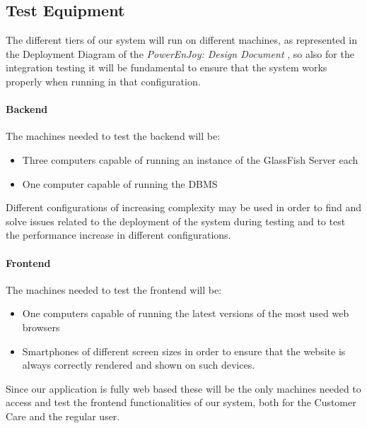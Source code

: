\subsection{Test Equipment}
The different tiers of our system will run on different machines, as represented in the Deployment Diagram of the \emph{PowerEnJoy: Design Document} \cite{DD}, so also for the integration testing it will be fundamental to ensure that the system works properly when running in that configuration.
\paragraph{Backend}
The machines needed to test the backend will be:
\begin{itemize}
	\item Three computers capable of running an instance of the GlassFish Server each
	\item One computer capable of running the DBMS
\end{itemize}
Different configurations of increasing complexity may be used in order to find and solve issues related to the deployment of the system during testing and to test the performance increase in different configurations.
\paragraph{Frontend}
The machines needed to test the frontend will be:
\begin{itemize}
	\item One computers capable of running the latest versions of the most used web browsers
	\item Smartphones of different screen sizes in order to ensure that the website is always correctly rendered and shown on such devices.
\end{itemize}
Since our application is fully web based these will be the only machines needed to access and test the frontend functionalities of our system, both for the Customer Care and the regular user.

